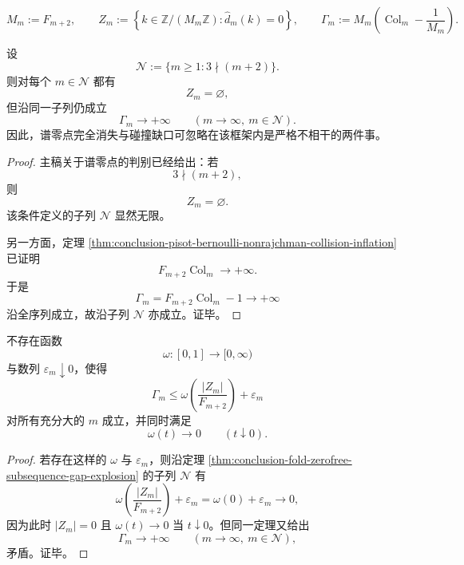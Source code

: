 \[
M_m:=F_{m+2},
\qquad
Z_m:=\left\{k\in \mathbb Z/(M_m\mathbb Z):\widehat d_m(k)=0\right\},
\qquad
\Gamma_m:=M_m\left(\operatorname{Col}_m-\frac1{M_m}\right).
\]

\begin{theorem}[零点完全空缺而缩放碰撞缺口仍爆发]\label{thm:conclusion-fold-zerofree-subsequence-gap-explosion}
设
\[
\mathcal N:=\{m\ge 1:3\nmid (m+2)\}.
\]
则对每个 \(m\in \mathcal N\) 都有
\[
Z_m=\varnothing,
\]
但沿同一子列仍成立
\[
\Gamma_m\longrightarrow +\infty
\qquad
(m\to\infty,\ m\in\mathcal N).
\]
因此，谱零点完全消失与碰撞缺口可忽略在该框架内是严格不相干的两件事。
\end{theorem}
\begin{proof}
主稿关于谱零点的判别已经给出：若
\[
3\nmid (m+2),
\]
则
\[
Z_m=\varnothing.
\]
该条件定义的子列 \(\mathcal N\) 显然无限。

另一方面，定理 \ref{thm:conclusion-pisot-bernoulli-nonrajchman-collision-inflation} 已证明
\[
F_{m+2}\operatorname{Col}_m\longrightarrow +\infty.
\]
于是
\[
\Gamma_m
=
F_{m+2}\operatorname{Col}_m-1
\longrightarrow
+\infty
\]
沿全序列成立，故沿子列 \(\mathcal N\) 亦成立。证毕。
\end{proof}

\begin{corollary}[零点计数不可能渐近控制缩放碰撞缺口]\label{cor:conclusion-fold-zero-count-cannot-control-gap}
不存在函数
\[
\omega:[0,1]\to[0,\infty)
\]
与数列 \(\varepsilon_m\downarrow 0\)，使得
\[
\Gamma_m\le \omega\!\left(\frac{|Z_m|}{F_{m+2}}\right)+\varepsilon_m
\]
对所有充分大的 \(m\) 成立，并同时满足
\[
\omega(t)\to 0
\qquad
(t\downarrow 0).
\]
\end{corollary}
\begin{proof}
若存在这样的 \(\omega\) 与 \(\varepsilon_m\)，则沿定理 \ref{thm:conclusion-fold-zerofree-subsequence-gap-explosion} 的子列 \(\mathcal N\) 有
\[
\omega\!\left(\frac{|Z_m|}{F_{m+2}}\right)+\varepsilon_m
=
\omega(0)+\varepsilon_m
\longrightarrow 0,
\]
因为此时 \(|Z_m|=0\) 且 \(\omega(t)\to 0\) 当 \(t\downarrow 0\)。但同一定理又给出
\[
\Gamma_m\to+\infty
\qquad
(m\to\infty,\ m\in\mathcal N),
\]
矛盾。证毕。
\end{proof}
